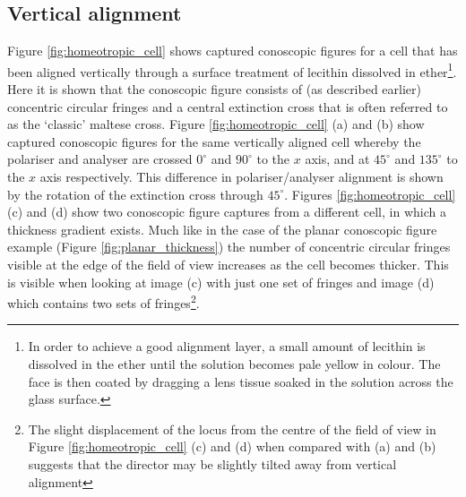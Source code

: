 \subsection{Vertical alignment}
Figure \ref{fig:homeotropic_cell} shows captured conoscopic figures for a cell that has been aligned vertically through a surface treatment of lecithin dissolved in ether\footnote{In order to achieve a good alignment layer, a small amount of lecithin is dissolved in the ether until the solution becomes pale yellow in colour. The face is then coated by dragging a lens tissue soaked in the solution across the glass surface.}. Here it is shown that the conoscopic figure consists of (as described earlier) concentric circular fringes and a central extinction cross that is often referred to as the `classic' maltese cross. Figure \ref{fig:homeotropic_cell} (a) and (b) show captured conoscopic figures for the same vertically aligned cell whereby the polariser and analyser are crossed $0^\circ$ and $90^\circ$ to the $x$ axis, and at $45^\circ$ and $135^\circ$ to the $x$ axis respectively. This difference in polariser/analyser alignment is shown by the rotation of the extinction cross through $45^\circ$. Figures \ref{fig:homeotropic_cell} (c) and (d) show two conoscopic figure captures from a different cell, in which a thickness gradient exists. Much like in the case of the planar conoscopic figure example (Figure \ref{fig:planar_thickness}) the number of concentric circular fringes visible at the edge of the field of view increases as the cell becomes thicker. This is visible when looking at image (c) with just one set of fringes and image (d) which contains two sets of fringes\footnote{The slight displacement of the locus from the centre of the field of view in Figure \ref{fig:homeotropic_cell} (c) and (d) when compared with (a) and (b) suggests that the director may be slightly tilted away from vertical alignment}.


